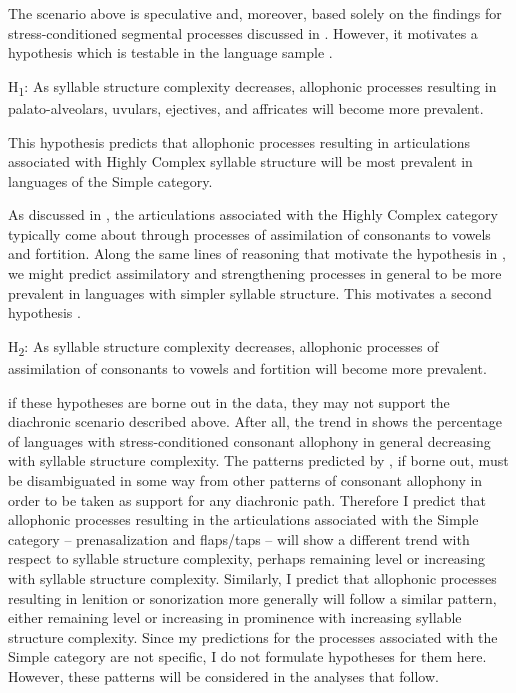   The scenario above is speculative and, moreover, based solely on the findings for stress-conditioned segmental processes discussed in . However, it motivates a hypothesis which is testable in the language sample .

\ea\label{ex:7.1}
  H\textsubscript{1}: As syllable structure complexity decreases, allophonic processes resulting in palato-alveolars, uvulars, ejectives, and affricates will become more prevalent.
\z

This hypothesis predicts that allophonic processes resulting in articulations associated with Highly Complex syllable structure will be most prevalent in languages of the Simple category.

  As discussed in , the articulations associated with the Highly Complex category typically come about through processes of assimilation of consonants to vowels and fortition. Along the same lines of reasoning that motivate the hypothesis in , we might predict assimilatory and strengthening processes in general to be more prevalent in languages with simpler syllable structure. This motivates a second hypothesis .

\ea\label{ex:7.2}
  H\textsubscript{2}: As syllable structure complexity decreases, allophonic processes of assimilation of consonants to vowels and fortition will become more prevalent.
\z

   if these hypotheses are borne out in the data, they may not support the diachronic scenario described above. After all, the trend in  shows the percentage of languages with stress-conditioned consonant allophony in general decreasing with syllable structure complexity. The patterns predicted by , if borne out, must be disambiguated in some way from other patterns of consonant allophony in order to be taken as support for any diachronic path. Therefore I predict that allophonic processes resulting in the articulations associated with the Simple category -- prenasalization and flaps/taps -- will show a different trend with respect to syllable structure complexity, perhaps remaining level or increasing with syllable structure complexity. Similarly, I predict that allophonic processes resulting in lenition or sonorization more generally will follow a similar pattern, either remaining level or increasing in prominence with increasing syllable structure complexity. Since my predictions for the processes associated with the Simple category are not specific, I do not formulate hypotheses for them here. However, these patterns will be considered in the analyses that follow.

